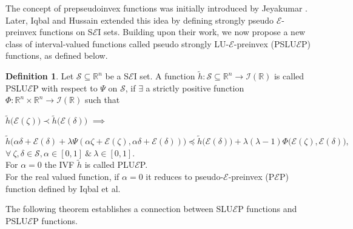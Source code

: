 \documentclass[12pt, reqno]{amsart}
\theoremstyle{definition}
\newtheorem{definition}{Definition}[section]
\theoremstyle{remark}
\numberwithin{equation}{section}
\begin{document}
      The concept of prepseudoinvex functions was initially introduced by Jeyakumar \cite{Jeyakumar}. Later, Iqbal and Hussain \cite{Iqbal2022} extended this idea by defining strongly pseudo $\mathcal{\mathcal{E}}$-preinvex functions on S$\mathcal{E}$I sets. Building upon their work, we now propose a new class of interval-valued functions called pseudo strongly LU-$\mathcal{\mathcal{E}}$-preinvex (PSLU$\mathcal{E}$P) functions, as defined below.

       \begin{definition}
     	Let $ {\mathcal{S}}\subseteq  \mathbb{R}^{n}$ be a S$\mathcal{E}$I set. A function $ \tilde{h}: {\mathcal{S}}\subseteq  \mathbb{R}^{n}\rightarrow  \mathcal{I}(\mathbb{R})$ is called PSLU$\mathcal{E}$P with respect to $ {\Psi}$ on $ {\mathcal{S}}$, if $\exists$
  a strictly positive function $ \mathfrak{\Phi}: \mathbb{R}^{n}\times \mathbb{R}^{n}\rightarrow  \mathcal{I}(\mathbb{R})$ such that 
     	
     	\noindent
     	$\tilde{h}\big({\mathcal{E}}(\mathit{\zeta} )\big)\prec\tilde{h}\big({\mathcal{E}} (\mathit{\delta} )\big)$ $\implies$ 
     	
     	\noindent
     	$\tilde{h}\big({\alpha}\mathit{\delta} +{\mathcal{E}} (\mathit{\delta} )+{\lambda}{\Psi}( {\alpha}\mathit{\zeta} +{\mathcal{E}}(\mathit{\zeta} ), {\alpha}\mathit{\delta} +{\mathcal{E}} (\mathit{\delta} ))\big)\preceq\tilde{h}\big({\mathcal{E}} (\mathit{\delta} )\big)+ {\lambda}({\lambda}-1)\mathfrak{\Phi}\big({\mathcal{E}}(\mathit{\zeta} ),{\mathcal{E}} (\mathit{\delta} )\big),$ $\forall~\mathit{\zeta} ,\mathit{\delta}  \in  {\mathcal{S}}, {\alpha}\in {[0,1]}~\&~{\lambda} \in {[0,1]}.$\\
     	
     	\noindent
     	For $\alpha=0$ the IVF $\tilde{h}$ is called PLU$\mathcal{E}$P.\\
        For the real valued function, if  $\alpha=0$ it reduces to pseudo-$\mathcal{E}$-preinvex (P$\mathcal{E}$P) function defined by Iqbal et al. \cite{Iqbal2022}
     \end{definition}
 
     	 
      The following theorem establishes a connection between  SLU$\mathcal{E}$P functions and PSLU$\mathcal{E}$P functions.
\end{document}
